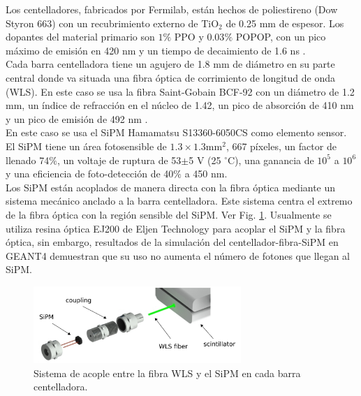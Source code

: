 Los centelladores, fabricados por Fermilab, están hechos de poliestireno (Dow Styron $663$) con un recubrimiento externo de TiO$_2$ de 0.25 mm de espesor. Los dopantes del material primario son $1\%$ PPO  y $0.03 \%$ POPOP, con un pico máximo de emisión en 420 nm \cite{Anghel2015} y un tiempo de decaimiento de 1.6 ns \cite{Kleinknecht2005}. \\

Cada barra centelladora tiene un agujero de 1.8 mm de diámetro en su parte central donde va situada una fibra óptica de corrimiento de longitud de onda (WLS). En este caso se usa la fibra Saint-Gobain BCF-92 con un diámetro de 1.2 mm, un índice de refracción en el núcleo de 1.42, un pico de absorción de 410 nm y un pico de emisión de 492 nm \cite{Kuraray2018}.\\

En este caso se usa el SiPM Hamamatsu S13360-6050CS como elemento sensor. El SiPM tiene un área fotosensible de 
$1.3 \times 1.3 \textrm{mm}^2$, 667 píxeles, un factor de llenado 74$\%$, un voltaje de ruptura de 53$\pm$5 V (25 $^{\circ}$C), una ganancia de $10^5$ a $10^6$ y una eficiencia de foto-detección de  40$\%$ a 450 nm.\\

Los SiPM están acoplados de manera directa con la fibra óptica mediante un sistema mecánico anclado a la barra centelladora. Este sistema centra el extremo de la fibra óptica con la región sensible del SiPM. Ver Fig. \ref{SiPM_WLS}. Usualmente se utiliza resina óptica EJ200 de Eljen Technology para acoplar el SiPM y la fibra óptica, sin embargo, resultados de la simulación del centellador-fibra-SiPM en GEANT4 \cite{Vasquez2018} demuestran que su uso no aumenta el número de fotones que llegan al SiPM.

\begin{figure}[h!]
\begin{center}
\includegraphics[width=0.7\textwidth]{Figures/panel_frontend.png}
\caption{Sistema de acople entre la fibra WLS y el SiPM en cada barra centelladora.}
\label{SiPM_WLS}
\end{center}
\end{figure}

